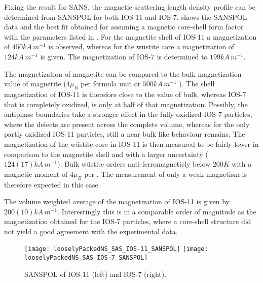 \documentclass[\main/dresen_thesis.tex]{subfiles}
\begin{document}
    Fixing the result for SANS, the magnetic scattering length density profile can be determined from SANSPOL for both IOS-11 and IOS-7.
     shows the SANSPOL data and the best fit obtained for assuming a magnetic core-shell form factor with the parameters listed in .
    For the magnetite shell of IOS-11 a magnetization of $450 \unit{kA \, m^{-1}}$ is observed, whereas for the w\"ustite core a magnetization of $124\unit{kA \, m^{-1}}$ is given.
    The magnetization of IOS-7 is determined to $199 \unit{kA \, m^{-1}}$.

    The magnetization of magnetite can be compared to the bulk magnetization value of magnetite ($4 \mu_B$ per formula unit or $500 \unit{kA \, m^{-1}}$ \cite{Handley_2000_Moder}).
    The shell magnetization of IOS-11 is therefore close to the value of bulk, whereas IOS-7 that is completely oxidized, is only at half of that magnetization.
    Possibly, the antiphase boundaries take a stronger effect in the fully oxidized IOS-7 particles, where the defects are present across the complete volume, whereas for the only partly oxidized IOS-11 particles, still a near bulk like behaviour remains.
    The magnetization of the w\"ustite core in IOS-11 is then measured to be fairly lower in comparison to the magnetite shell and with a larger uncertainty ($124(17) \unit{kA \, m^{-1}}$).
    Bulk w\"ustite orders anti-ferromagneticly below $200 \unit{K}$ with a magnetic moment of $4 \mu_B$ per  \cite{Handley_2000_Moder}.
    The measurement of only a weak magnetism is therefore expected in this case.
    
    The volume weighted average of the magnetization of IOS-11 is given by $200(10) \unit{kA \, m^{-1}}$.
    Interestingly this is in a comparable order of magnitude as the magnetization obtained for the IOS-7 particles, where a core-shell structure did not yield a good agreement with the experimental data.

    \begin{figure}[!htbp]
      \centering
      \texttt{[image: looselyPackedNS\_SAS\_IOS-11\_SANSPOL]}
      \texttt{[image: looselyPackedNS\_SAS\_IOS-7\_SANSPOL]}
      \caption{\label{fig:looselyPackedNP:nanoparticle:sanspol}SANSPOL of IOS-11 (left) and IOS-7 (right).}
    \end{figure}
\end{document}
